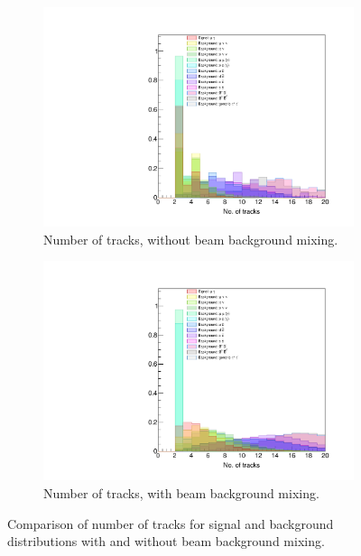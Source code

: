 \documentclass[12pt]{thesis}  %
\begin{document}
   \begin{figure}[h]
        \centering
        \begin{subfigure}[b]{0.475\textwidth}
            \centering
            \includegraphics[width=\textwidth]{images/tauMG-tracks-BGx0.pdf}
            \caption[]%
            {{\small Number of tracks, without beam background mixing.}}
            \label{fig:tracks w/o beam background}   
        \end{subfigure}
        \hfill
        \begin{subfigure}[b]{0.475\textwidth}  
            \centering 
            \includegraphics[width=\textwidth]{images/tauMG-tracks.pdf}
            \caption[]%
            {{\small Number of tracks, with beam background mixing.}}    
            \label{fig:tracks w/ beam background}
        \end{subfigure}
        \caption[]%
        {{\small Comparison of number of tracks for signal and background distributions with and without beam background mixing.}}
    \end{figure}
    
\end{document}
